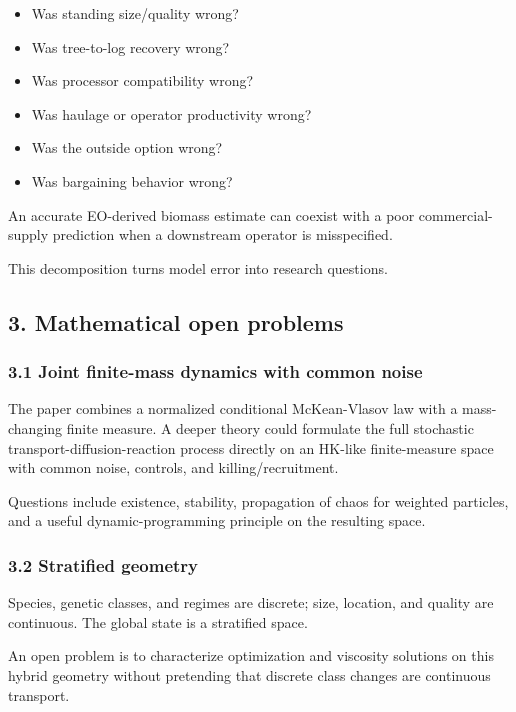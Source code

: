 \begin{itemize}
\tightlist
\item
  Was standing size/quality wrong?
\item
  Was tree-to-log recovery wrong?
\item
  Was processor compatibility wrong?
\item
  Was haulage or operator productivity wrong?
\item
  Was the outside option wrong?
\item
  Was bargaining behavior wrong?
\end{itemize}

An accurate EO-derived biomass estimate can coexist with a poor commercial-supply
prediction when a downstream operator is misspecified.

This decomposition turns model error into research questions.

\subsection{3. Mathematical open problems}\label{mathematical-open-problems}

\subsubsection{3.1 Joint finite-mass dynamics with common noise}\label{joint-finite-mass-dynamics-with-common-noise}

The paper combines a normalized conditional McKean-Vlasov law with a
mass-changing finite measure. A deeper theory could formulate the full
stochastic transport-diffusion-reaction process directly on an HK-like
finite-measure space with common noise, controls, and killing/recruitment.

Questions include existence, stability, propagation of chaos for weighted
particles, and a useful dynamic-programming principle on the resulting space.

\subsubsection{3.2 Stratified geometry}\label{stratified-geometry}

Species, genetic classes, and regimes are discrete; size, location, and quality
are continuous. The global state is a stratified space.

An open problem is to characterize optimization and viscosity solutions on this
hybrid geometry without pretending that discrete class changes are continuous
transport.

